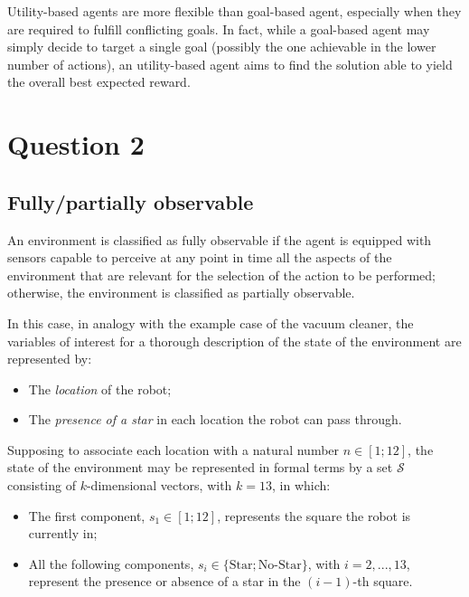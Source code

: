 \documentclass[letterpaper,headings=standardclasses]{scrartcl}
\begin{document}
Utility-based agents are more flexible than goal-based agent, especially when they are required to fulfill conflicting goals. In fact, while a goal-based agent may simply decide to target a single goal (possibly the one achievable in the lower number of actions), an utility-based agent aims to find the solution able to yield the overall best expected reward.

\section{Question 2}

\subsection{Fully/partially observable}

An environment is classified as fully observable if the agent is equipped with sensors capable to perceive at any point in time all the aspects of the environment that are relevant for the selection of the action to be performed; otherwise, the environment is classified as partially observable.

In this case, in analogy with the example case of the vacuum cleaner, the variables of interest for a thorough description of the state of the environment are represented by:

\begin{itemize}

\item The \emph{location} of the robot;
\item The \emph{presence of a star} in each location the robot can pass through.

\end{itemize}

Supposing to associate each location with a natural number $n \in [1; 12]$, the state of the environment may be represented in formal terms by a set $\mathcal{S}$ consisting of $k$-dimensional vectors, with $k = 13$, in which:

\begin{itemize}

\item The first component, $s_1 \in [1;12]$, represents the square the robot is currently in;
\item All the following components, $s_i \in \{\text{Star}; \text{No-Star}\}$, with $i = 2, ..., 13$, represent the presence or absence of a star in the $(i-1)$-th square.

\end{itemize}
\end{document}
